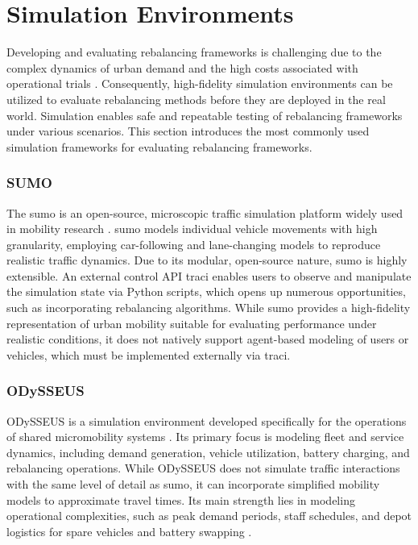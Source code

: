 \section{Simulation Environments}\label{sec:related-work_simulator}
Developing and evaluating rebalancing frameworks is challenging due to the complex dynamics of urban demand and the high costs associated with operational trials \cite{chouaki_review_2025}.
Consequently, high-fidelity simulation environments can be utilized to evaluate rebalancing methods before they are deployed in the real world.
Simulation enables safe and repeatable testing of rebalancing frameworks under various scenarios.
This section introduces the most commonly used simulation frameworks for evaluating rebalancing frameworks.

\subsubsection{SUMO}
The \gls{sumo} is an open-source, microscopic traffic simulation platform widely used in mobility research \cite{alvarez_lopez_simulation_2025}.
\gls{sumo} models individual vehicle movements with high granularity, employing car-following and lane-changing models to reproduce realistic traffic dynamics.
Due to its modular, open-source nature, \gls{sumo} is highly extensible.
An external control API \gls{traci} enables users to observe and manipulate the simulation state via Python scripts, which opens up numerous opportunities, such as incorporating rebalancing algorithms.
While \gls{sumo} provides a high-fidelity representation of urban mobility suitable for evaluating performance under realistic conditions, it does not natively support agent-based modeling of users or vehicles, which must be implemented externally via \gls{traci}.

\subsubsection{ODySSEUS}
ODySSEUS is a simulation environment developed specifically for the operations of shared micromobility systems \cite{smartdatapolito_smartdatapolitoodysseus_2022}.
Its primary focus is modeling fleet and service dynamics, including demand generation, vehicle utilization, battery charging, and rebalancing operations.
While ODySSEUS does not simulate traffic interactions with the same level of detail as \gls{sumo}, it can incorporate simplified mobility models to approximate travel times.
Its main strength lies in modeling operational complexities, such as peak demand periods, staff schedules, and depot logistics for spare vehicles and battery swapping \cite{smartdatapolito_smartdatapolitoodysseus_2022}.

